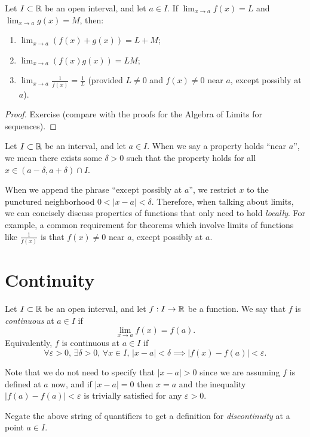\documentclass[../analysis1.tex]{subfiles}
\begin{document}
\begin{theorem}
\label{thm:altfunctions}
    \begin{shaded*}
        Let $I\subset\mathbb{R}$ be an open interval, and let $a\in I$. If $\lim_{x \to a} f(x) = L$ and $\lim_{x \to a} g(x) = M$, then:
        \begin{enumerate}
            \item[1.] $\lim_{x \to a} (f(x) + g(x)) = L + M$;
            \item[2.] $\lim_{x \to a} (f(x)g(x)) = LM$;
            \item[3.] $\lim_{x \to a} \frac{1}{f(x)} = \frac{1}{L}$ (provided $L \neq 0$ and $f(x) \neq 0$ near $a$, except possibly at $a$).
        \end{enumerate}
    \end{shaded*}
\end{theorem}
\begin{proof}
    Exercise (compare with the proofs for the Algebra of Limits for sequences).\qedhere
\end{proof}


\begin{remark}
    Let $I \subset \mathbb{R}$ be an interval, and let $a \in I$. When we say a property holds ``near $a$'', we mean there exists some $\delta > 0$ such that the property holds for all $x \in (a-\delta, a+\delta) \cap I$. 
    
    When we append the phrase ``except possibly at $a$'', we restrict $x$ to the punctured neighborhood $0 < |x-a| < \delta$. Therefore, when talking about limits, we can concisely discuss properties of functions that only need to hold \textit{locally}.
    For example, a common requirement for theorems which involve limits of functions like $\frac{1}{f(x)}$ is that $f(x) \neq 0$ near $a$, except possibly at $a$.
\end{remark}


\section{Continuity}

\begin{definition}
    \begin{shaded*}
        Let $I\subset\mathbb{R}$ be an open interval, and let $f:I\to\mathbb{R}$ be a function. We say that $f$ is \textit{continuous} at $a\in I$ if
        \[\lim_{x\to a}f(x)=f(a).\]
        Equivalently, $f$ is continuous at $a\in I$ if
        \[\forall\varepsilon>0,\,\exists\delta>0,\,\forall x\in I,\, |x-a|<\delta\implies |f(x)-f(a)|<\varepsilon.\]
    \end{shaded*}
\end{definition}
\begin{remark}
    Note that we do not need to specify that $|x-a|>0$ since we are assuming $f$ is defined at $a$ now, and if $|x-a|=0$ then $x=a$ and the inequality $|f(a)-f(a)|<\varepsilon$ is trivially satisfied for any $\varepsilon>0$. 
\end{remark}
\begin{exercise*}
    Negate the above string of quantifiers to get a definition for \textit{discontinuity} at a point $a\in I$.
\end{exercise*}
\end{document}
